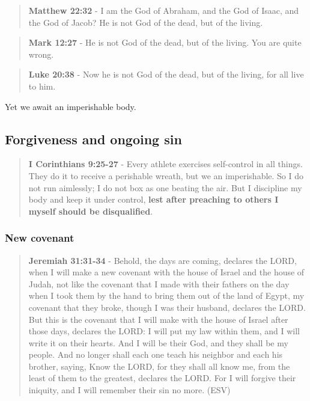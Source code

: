 \documentclass[11pt]{article}
\begin{document}
\begin{quote}
\textbf{Matthew 22:32} - I am the God of Abraham, and the God of Isaac, and the God of Jacob? He is not God of the dead, but of the living.
\end{quote}

\begin{quote}
\textbf{Mark 12:27} - He is not God of the dead, but of the living. You are quite wrong.
\end{quote}

\begin{quote}
\textbf{Luke 20:38} - Now he is not God of the dead, but of the living, for all live to him.
\end{quote}

Yet we await an imperishable body.

\subsection{Forgiveness and ongoing sin}
\label{sec:orgbd5d954}
\begin{quote}
\textbf{I Corinthians 9:25-27} - Every athlete exercises self-control in all things. They do it to receive a perishable wreath, but we an imperishable. So I do not run aimlessly; I do not box as one beating the air. But I discipline my body and keep it under control, \textbf{lest after preaching to others I myself should be disqualified}.
\end{quote}

\subsubsection{New covenant}
\label{sec:orga5c38ed}
\begin{quote}
\textbf{Jeremiah 31:31-34} - Behold, the days are coming, declares the LORD, when I will make a new covenant with the house of Israel and the house of Judah, not like the covenant that I made with their fathers on the day when I took them by the hand to bring them out of the land of Egypt, my covenant that they broke, though I was their husband, declares the LORD. But this is the covenant that I will make with the house of Israel after those days, declares the LORD: I will put my law within them, and I will write it on their hearts. And I will be their God, and they shall be my people. And no longer shall each one teach his neighbor and each his brother, saying, Know the LORD, for they shall all know me, from the least of them to the greatest, declares the LORD. For I will forgive their iniquity, and I will remember their sin no more. (ESV)
\end{quote}
\end{document}
